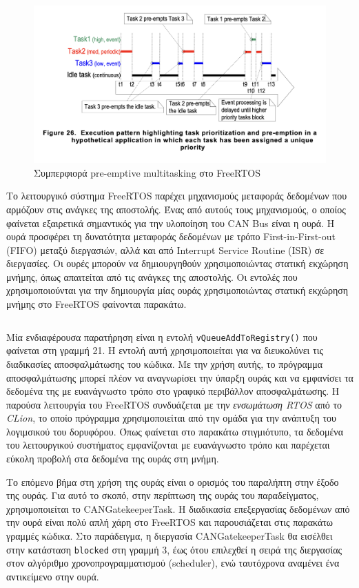 \documentclass[a4paper,nobib,justified]{tufte-book}
\begin{document}
\begin{figure}[ht]
	\includegraphics[width=0.8\linewidth]{media/diagrams/freeRTOS-preemptive-multitasking.png}
	\caption{Συμπερφιορά pre-emptive multitasking στο FreeRTOS}
	\label{fig:freeRTOS-preemptive-multitasking}
\end{figure}

Το λειτουργικό σύστημα FreeRTOS παρέχει μηχανισμούς μεταφοράς δεδομένων που αρμόζουν στις ανάγκες της αποστολής. Ένας από αυτούς τους μηχανισμούς, ο οποίος φαίνεται εξαιρετικά σημαντικός για την υλοποίηση του CAN Bus είναι η ουρά. Η ουρά προσφέρει τη δυνατότητα μεταφοράς δεδομένων με τρόπο First-in-First-out (FIFO) μεταξύ διεργασιών, αλλά και από Interrupt Service Routine (ISR) σε διεργασίες. Οι ουρές μπορούν να δημιουργηθούν χρησιμοποιώντας στατική εκχώρηση μνήμης, όπως απαιτείται από τις ανάγκες της αποστολής. Οι εντολές που χρησιμοποιούνται για την δημιουργία μίας ουράς χρησιμοποιώντας στατική εκχώρηση μνήμης στο FreeRTOS φαίνονται παρακάτω.
\inputminted{c++}{code/examples/gatekeeper-queue.cpp}

\label{sec:queue-registry}
Μία ενδιαφέρουσα παρατήρηση είναι η εντολή \texttt{vQueueAddToRegistry()} που φαίνεται στη γραμμή 21. Η εντολή αυτή χρησιμοποιείται για να διευκολύνει τις διαδικασίες αποσφαλμάτωσης του κώδικα. Με την χρήση αυτής, το πρόγραμμα αποσφαλμάτωσης μπορεί πλέον να αναγνωρίσει την ύπαρξη ουράς και να εμφανίσει τα δεδομένα της με ευανάγνωστο τρόπο στο γραφικό περιβάλλον αποσφαλμάτωσης. Η παρούσα λειτουργία του FreeRTOS συνδυάζεται με την \emph{ενσωμάτωση RTOS} από το \emph{CLion}, το οποίο πρόγραμμα χρησιμοποιείται από την ομάδα για την ανάπτυξη του λογιμσικού του δορυφόρου. Όπως φαίνεται στο παρακάτω στιγμιότυπο, τα δεδομένα του λειτουργικού συστήματος εμφανίζονται με ευανάγνωστο τρόπο και παρέχεται εύκολη προβολή στα δεδομένα της ουράς στη μνήμη. 

Το επόμενο βήμα στη χρήση της ουράς είναι ο ορισμός του παραλήπτη στην έξοδο της ουράς. Για αυτό το σκοπό, στην περίπτωση της ουράς του παραδείγματος, χρησιμοποιείται το CANGatekeeperTask. Η διαδικασία επεξεργασίας δεδομένων από την ουρά είναι πολύ απλή χάρη στο FreeRTOS και παρουσιάζεται στις παρακάτω γραμμές κώδικα. Στο παράδειγμα, η διεργασία CANGatekeeperTask θα εισέλθει στην κατάσταση \texttt{blocked} στη γραμμή 3, έως ότου επιλεχθεί η σειρά της διεργασίας στον αλγόριθμο χρονοπρογραμματισμού (scheduler), ενώ ταυτόχρονα αναμένει ένα αντικείμενο στην ουρά.
\inputminted{c++}{code/examples/gatekeeper-execute-short.cpp}
\end{document}
